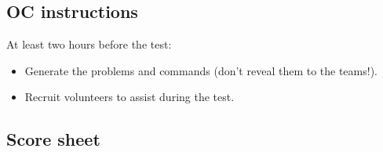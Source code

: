 \subsection*{OC instructions}

At least two hours before the test:
\begin{itemize}
	\item Generate the problems and commands (don't reveal them to the teams!).
	\item Recruit volunteers to assist during the test.
\end{itemize}


\subsection*{Score sheet}


